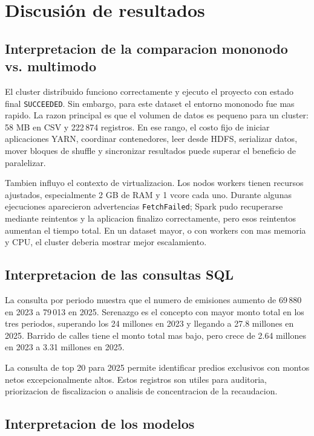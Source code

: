 \section{Discusi\'on de resultados}

\subsection{Interpretacion de la comparacion mononodo vs. multimodo}

El cluster distribuido funciono correctamente y ejecuto el proyecto con estado final \texttt{SUCCEEDED}. Sin embargo, para este dataset el entorno mononodo fue mas rapido. La razon principal es que el volumen de datos es pequeno para un cluster: 58 MB en CSV y 222\,874 registros. En ese rango, el costo fijo de iniciar aplicaciones YARN, coordinar contenedores, leer desde HDFS, serializar datos, mover bloques de shuffle y sincronizar resultados puede superar el beneficio de paralelizar.

Tambien influyo el contexto de virtualizacion. Los nodos workers tienen recursos ajustados, especialmente 2 GB de RAM y 1 vcore cada uno. Durante algunas ejecuciones aparecieron advertencias \texttt{FetchFailed}; Spark pudo recuperarse mediante reintentos y la aplicacion finalizo correctamente, pero esos reintentos aumentan el tiempo total. En un dataset mayor, o con workers con mas memoria y CPU, el cluster deberia mostrar mejor escalamiento.

\subsection{Interpretacion de las consultas SQL}

La consulta por periodo muestra que el numero de emisiones aumento de 69\,880 en 2023 a 79\,013 en 2025. Serenazgo es el concepto con mayor monto total en los tres periodos, superando los 24 millones en 2023 y llegando a 27.8 millones en 2025. Barrido de calles tiene el monto total mas bajo, pero crece de 2.64 millones en 2023 a 3.31 millones en 2025.

La consulta de top 20 para 2025 permite identificar predios exclusivos con montos netos excepcionalmente altos. Estos registros son utiles para auditoria, priorizacion de fiscalizacion o analisis de concentracion de la recaudacion.

\subsection{Interpretacion de los modelos}

